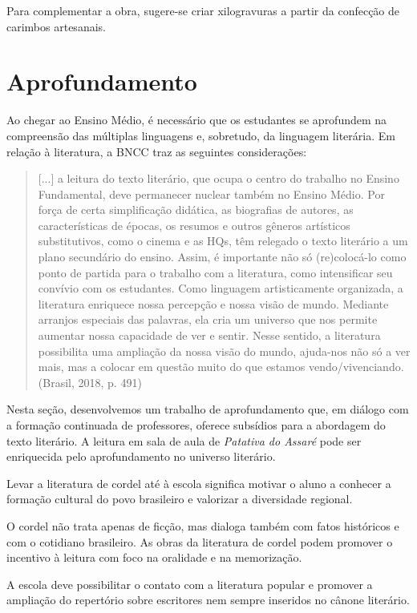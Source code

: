 \documentclass{extarticle}
\begin{document}
Para complementar a obra, sugere-se criar xilogravuras a partir da
confecção de carimbos artesanais.

\section{Aprofundamento}

Ao chegar ao Ensino Médio, é necessário que os estudantes se aprofundem
na compreensão das múltiplas linguagens e, sobretudo, da linguagem
literária. Em relação à literatura, a BNCC traz as seguintes
considerações:

\begin{quote}
{[}...{]} a leitura do texto literário, que ocupa o centro do trabalho
no Ensino Fundamental, deve permanecer nuclear também no Ensino Médio.
Por força de certa simplificação didática, as biografias de autores, as
características de épocas, os resumos e outros gêneros artísticos
substitutivos, como o cinema e as HQs, têm relegado o texto literário a
um plano secundário do ensino. Assim, é importante não só (re)colocá-lo
como ponto de partida para o trabalho com a literatura, como
intensificar seu convívio com os estudantes. Como linguagem
artisticamente organizada, a literatura enriquece nossa percepção e
nossa visão de mundo. Mediante arranjos especiais das palavras, ela cria
um universo que nos permite aumentar nossa capacidade de ver e sentir.
Nesse sentido, a literatura possibilita uma ampliação da nossa visão do
mundo, ajuda-nos não só a ver mais, mas a colocar em questão muito do
que estamos vendo/vivenciando. (Brasil, 2018, p. 491)
\end{quote}

Nesta seção, desenvolvemos um trabalho de aprofundamento que, em diálogo
com a formação continuada de professores, oferece subsídios para a
abordagem do texto literário. A leitura em sala de aula de
\emph{Patativa do Assaré} pode ser enriquecida pelo aprofundamento no
universo literário.

Levar a literatura de cordel até à escola significa motivar o aluno a
conhecer a formação cultural do povo brasileiro e valorizar a
diversidade regional.

O cordel não trata apenas de ficção, mas dialoga também com fatos
históricos e com o cotidiano brasileiro. As obras da literatura de
cordel podem promover o incentivo à leitura com foco na oralidade e na
memorização.

A escola deve possibilitar o contato com a literatura popular e promover
a ampliação do repertório sobre escritores nem sempre inseridos no
cânone literário.
\end{document}
